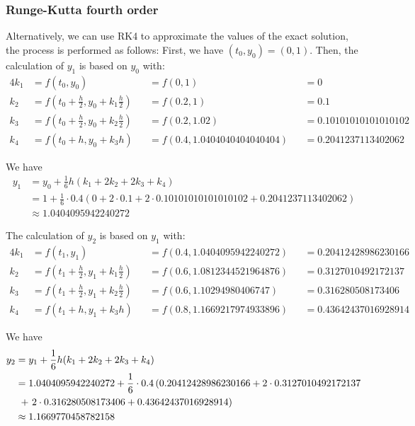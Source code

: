 \documentclass[a4paper]{article}
\begin{document}
\subsubsection{Runge-Kutta fourth order}
Alternatively, we can use RK4 to approximate the values of the exact solution, the process is performed as follows:
First, we have \((t_0, y_0) = (0, 1)\). Then, the calculation of \(y_1\) is based on \(y_0\) with:
\begin{alignat*}{4}
  k_1 & = f(t_0, y_0)                                            &  & = f(0, 1)                    &  & = 0                   \\
  k_2 & = f \left(t_0 + \frac{h}{2}, y_0 + k_1\frac{h}{2}\right) &  & = f(0.2, 1)                  &  & = 0.1                 \\
  k_3 & = f \left(t_0 + \frac{h}{2}, y_0 + k_2\frac{h}{2}\right) &  & = f(0.2, 1.02)               &  & = 0.10101010101010102 \\
  k_4 & = f(t_0 + h, y_0 + k_3h)                                 &  & = f(0.4, 1.0404040404040404) &  & = 0.2041237113402062
\end{alignat*}

We have
\begin{align*}
  y_1 & = y_0 + \frac{1}{6}h(k_1 + 2k_2 + 2k_3 + k_4)                                                              \\
      & = 1 + \frac{1}{6} \cdot 0.4\left(0 + 2 \cdot 0.1 + 2 \cdot 0.10101010101010102 + 0.2041237113402062\right) \\
      & \approx 1.0404095942240272
\end{align*}

The calculation of \(y_2\) is based on \(y_1\) with:
\begin{alignat*}{4}
  k_1 & = f(t_1, y_1)                                            &  & = f(0.4, 1.0404095942240272) &  & = 0.20412428986230166 \\
  k_2 & = f \left(t_1 + \frac{h}{2}, y_1 + k_1\frac{h}{2}\right) &  & = f(0.6, 1.0812344521964876) &  & = 0.3127010492172137  \\
  k_3 & = f \left(t_1 + \frac{h}{2}, y_1 + k_2\frac{h}{2}\right) &  & = f(0.6, 1.10294980406747)   &  & = 0.316280508173406   \\
  k_4 & = f(t_1 + h, y_1 + k_3h)                                 &  & = f(0.8, 1.1669217974933896) &  & = 0.43642437016928914
\end{alignat*}

We have
\begin{align*}
  y_2 & = y_1 + \frac{1}{6}h(k_1 + 2k_2 + 2k_3 + k_4)                                                             \\
      & = 1.0404095942240272 + \frac{1}{6} \cdot 0.4\left(0.20412428986230166 + 2 \cdot 0.3127010492172137\right. \\
      & \;\left.+\ 2 \cdot 0.316280508173406 + 0.43642437016928914\vphantom{1}\right)                             \\
      & \approx 1.1669770458782158
\end{align*}
\end{document}
